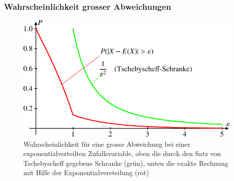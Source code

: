 \subsubsection{Wahrscheinlichkeit grosser Abweichungen}
\begin{figure}
\begin{center}
\includegraphics{images/exp-1.pdf}
\end{center}
\caption{Wahrscheinlichkeit für eine grosse Abweichung bei einer
exponentialverteilten Zufallsvariable, oben die durch den Satz von Tschebyscheff
gegebene Schranke (grün), unten die exakte Rechnung mit
Hilfe der Exponentialvereteilung (rot)\label{abweichung-exponential}}
\end{figure}
